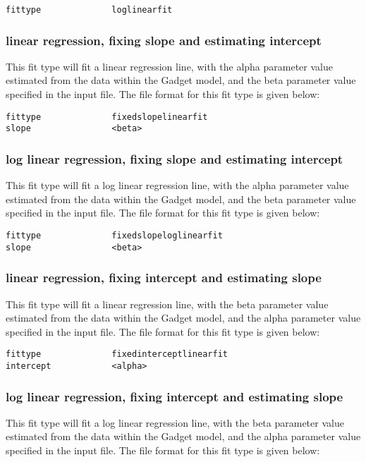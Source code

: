 \documentclass [a4paper, 10pt]{book}
\begin{document}
{\small\begin{verbatim}
fittype              loglinearfit
\end{verbatim}}

\subsubsection{linear regression, fixing slope and estimating intercept}
This fit type will fit a linear regression line, with the alpha parameter value estimated from the data within the Gadget model, and the beta parameter value specified in the input file.  The file format for this fit type is given below:

{\small\begin{verbatim}
fittype              fixedslopelinearfit
slope                <beta>
\end{verbatim}}

\subsubsection{log linear regression, fixing slope and estimating intercept}
This fit type will fit a log linear regression line, with the alpha parameter value estimated from the data within the Gadget model, and the beta parameter value specified in the input file.  The file format for this fit type is given below:

{\small\begin{verbatim}
fittype              fixedslopeloglinearfit
slope                <beta>
\end{verbatim}}

\subsubsection{linear regression, fixing intercept and estimating slope}
This fit type will fit a linear regression line, with the beta parameter value estimated from the data within the Gadget model, and the alpha parameter value specified in the input file.  The file format for this fit type is given below:

{\small\begin{verbatim}
fittype              fixedinterceptlinearfit
intercept            <alpha>
\end{verbatim}}

\subsubsection{log linear regression, fixing intercept and estimating slope}
This fit type will fit a log linear regression line, with the beta parameter value estimated from the data within the Gadget model, and the alpha parameter value specified in the input file.  The file format for this fit type is given below:
\end{document}
